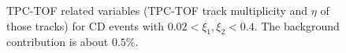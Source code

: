 \begin{figure}[H]
{		\begin{subfigure}[b]{\linewidth}{
				}
		\end{subfigure}
	}
	\quad
	\parbox{0.48\textwidth}{
		\centering
		\begin{subfigure}[b]{\linewidth}{
				}
		\end{subfigure}
	}
	\caption[x]{TPC-TOF related variables (TPC-TOF track multiplicity and $\eta$ of those tracks) for CD events with $0.02<\xi_1,\xi_2<0.4$. The background contribution is about $0.5\%$.}
\end{figure}

